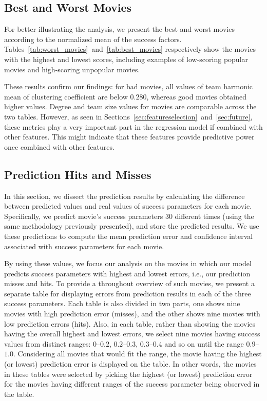 

\subsection{Best and Worst Movies}\label{sec:bestworst}
For better illustrating the analysis, we present the best and worst movies
according to the normalized mean of the success factors.
Tables~\ref{tab:worst_movies}~and~\ref{tab:best_movies} respectively show the
movies with the highest and lowest scores, including examples of low-scoring
popular movies and high-scoring unpopular movies.




These results confirm our findings: for bad movies, all values of team harmonic
mean of clustering coefficient are below $0.280$, whereas good movies obtained
higher values. Degree and team size values for movies are comparable across the
two tables. However, as seen in
Sections~\ref{sec:featureselection}~and~\ref{sec:future}, these metrics play a
very important part in the regression model if combined with other features.
This might indicate that these features provide predictive power once combined
with other features.

\subsection{Prediction Hits and Misses}
\label{sec:hitsmisses}
In this section, we dissect the prediction results by calculating the
difference between predicted values and real values of success parameters for
each movie. Specifically, we predict movie's success parameters 30 different
times (using the same methodology previously presented), and store the
predicted results. We use these predictions to compute the mean prediction
error and confidence interval associated with success parameters for each
movie.

By using these values, we focus our analysis on the movies in which our model
predicts success parameters with highest and lowest errors, i.e., our
prediction misses and hits. To provide a throughout overview of such movies, we
present a separate table for displaying errors from prediction results in each
of the three success parameters. Each table is also divided in two parts, one
shows nine movies with high prediction error (misses), and the other shows nine
movies with low prediction errors (hits). Also, in each table, rather than
showing the movies having the overall highest and lowest errors, we select nine
movies having success values from distinct ranges: $0$--$0.2$, $0.2$--$0.3$,
$0.3$--$0.4$ and so on until the range $0.9$--$1.0$. Considering all movies
that would fit the range, the movie having the highest (or lowest) prediction
error is displayed on the table. In other words, the movies in these tables
were selected by picking the highest (or lowest) prediction error for the
movies having different ranges of the success parameter being observed in the
table.

